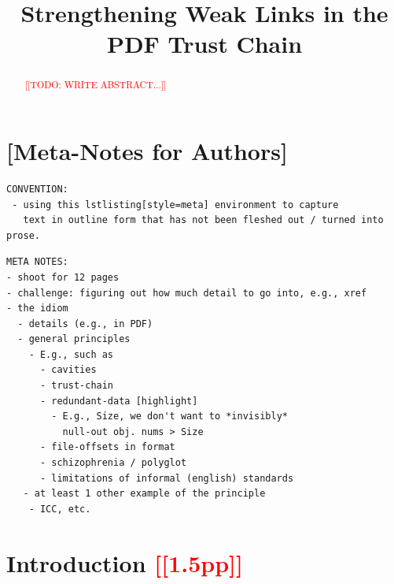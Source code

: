 \documentclass[conference,12pt]{IEEEtran}
\newcommand{\note}[1]{\noteYes{#1}}
\newcommand{\noteYes}[1]{\textcolor{red}{[[#1]]}}
\newcommand{\todo}[1]{\note{TODO: #1}}
\begin{document}
\date{}

\title{Strengthening Weak Links in the PDF Trust Chain}

\author{
     \and
}

\maketitle

\begin{abstract}

\todo{WRITE ABSTRACT...}
  
\end{abstract}

\section{[Meta-Notes for Authors]}

\begin{lstlisting}[style=meta]
CONVENTION:
 - using this lstlisting[style=meta] environment to capture
   text in outline form that has not been fleshed out / turned into prose.
\end{lstlisting}

\begin{lstlisting}[style=meta]
META NOTES:  
- shoot for 12 pages
- challenge: figuring out how much detail to go into, e.g., xref
- the idiom
  - details (e.g., in PDF)
  - general principles
    - E.g., such as
      - cavities
      - trust-chain 
      - redundant-data [highlight]
        - E.g., Size, we don't want to *invisibly*
          null-out obj. nums > Size
      - file-offsets in format
      - schizophrenia / polyglot
      - limitations of informal (english) standards
   - at least 1 other example of the principle
    - ICC, etc.
\end{lstlisting}

\section{Introduction \note{1.5pp}}
\label{sec:intro}
\end{document}
